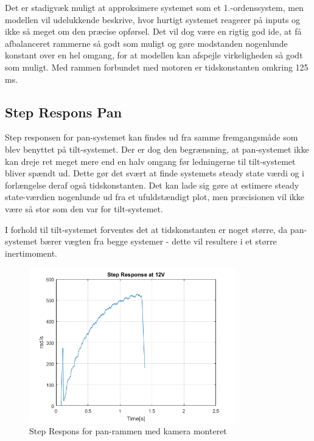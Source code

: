 Det er stadigvæk muligt at approksimere systemet som et 1.-ordenssystem, men modellen vil udelukkende beskrive, hvor hurtigt systemet reagerer på inputs og ikke så meget om den præcise opførsel. Det vil dog være en rigtig god ide, at få afbalanceret rammerne så godt som muligt og gøre modstanden nogenlunde konstant over en hel omgang, for at modellen kan afspejle virkeligheden så godt som muligt. Med rammen forbundet med motoren er tidskonstanten omkring 125 ms.

\subsection{Step Respons Pan}

Step responsen for pan-systemet kan findes ud fra samme fremgangsmåde som blev benyttet på tilt-systemet. Der er dog den begrænsning, at pan-systemet ikke kan dreje ret meget mere end en halv omgang før ledningerne til tilt-systemet bliver spændt ud. Dette gør det svært at finde systemets steady state værdi og i forlængelse deraf også tidskonstanten. Det kan lade sig gøre at estimere steady state-værdien nogenlunde ud fra et ufuldstændigt plot, men præcisionen vil ikke være så stor som den var for tilt-systemet. 

I forhold til tilt-systemet forventes det at tidskonstanten er noget større, da pan-systemet bærer vægten fra begge systemer - dette vil resultere i et større inertimoment. 

\begin{figure}[!ht]
	\begin{center}
		\includegraphics[width=0.8\textwidth]{Billeder/Pan_Response.png}
	\end{center}
	\caption{Step Respons for pan-rammen med kamera monteret}
	\label{fig:Pan_Response}
\end{figure}

